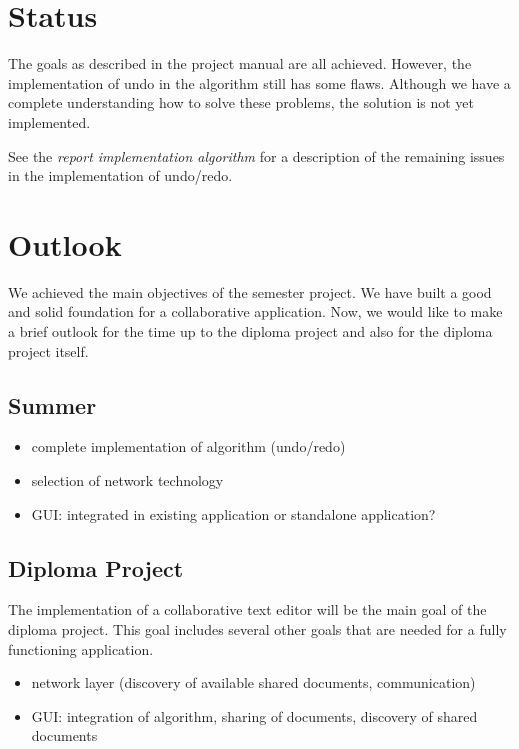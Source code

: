 \documentclass[11pt,a4paper]{article}
\begin{document}
\section{Status}
The goals as described in the project manual are all achieved. However, the implementation of undo in the algorithm still has some flaws. Although we have a complete understanding how to solve these problems, the solution is not yet implemented.

See the \emph{report implementation algorithm} for a description of the remaining issues in the implementation of undo/redo.


\section{Outlook}
We achieved the main objectives of the semester project. We have built a good and solid foundation for a collaborative application. Now, we would like to make a brief outlook for the time up to the diploma project and also for the diploma project itself.

\subsection{Summer}
\begin{itemize}
 \item complete implementation of algorithm (undo/redo)
 \item selection of network technology
 \item GUI: integrated in existing application or standalone application?
\end{itemize}

\subsection{Diploma Project}
The implementation of a collaborative text editor will be the main goal of the diploma project. This goal includes several other goals that are needed for a fully functioning application.
\begin{itemize}
 \item network layer (discovery of available shared documents, communication)
 \item GUI: integration of algorithm, sharing of documents, discovery of shared documents
\end{itemize}
\end{document}
